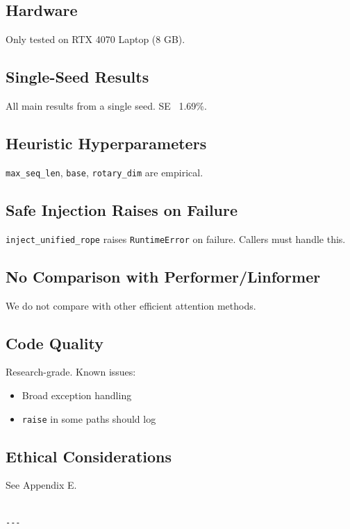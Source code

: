 \subsection{Hardware}

Only tested on RTX 4070 Laptop (8 GB).

\subsection{Single-Seed Results}

All main results from a single seed. SE ~1.69\%.

\subsection{Heuristic Hyperparameters}

\texttt{max\_seq\_len}, \texttt{base}, \texttt{rotary\_dim} are empirical.

\subsection{Safe Injection Raises on Failure}

\texttt{inject\_unified\_rope} raises \texttt{RuntimeError} on failure. Callers must 
handle this.

\subsection{No Comparison with Performer/Linformer}

We do not compare with other efficient attention methods.

\subsection{Code Quality}

Research-grade. Known issues:
\begin{itemize}
\item Broad exception handling
\item \texttt{raise} in some paths should log

\end{itemize}
\subsection{Ethical Considerations}

See Appendix E.
\begin{lstlisting}

---
\end{lstlisting}